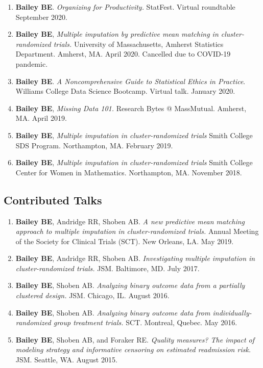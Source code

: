 \documentclass[
  fleqn, oneside]{article}
\begin{document}
\begin{enumerate}
\def\labelenumi{\arabic{enumi}.}
\item
  \textbf{Bailey BE}. \emph{Organizing for Productivity.} StatFest.
  Virtual roundtable September 2020.
\item
  \textbf{Bailey BE}, \emph{Multiple imputation by predictive mean
  matching in cluster-randomized trials.} University of Massachusetts,
  Amherst Statistics Department. Amherst, MA. April 2020. Cancelled due
  to COVID-19 pandemic.
\item
  \textbf{Bailey BE}. \emph{A Noncomprehensive Guide to Statistical
  Ethics in Practice}. Williams College Data Science Bootcamp. Virtual
  talk. January 2020.
\item
  \textbf{Bailey BE}, \emph{Missing Data 101.} Research Bytes @
  MassMutual. Amherst, MA. April 2019.
\item
  \textbf{Bailey BE}, \emph{Multiple imputation in cluster-randomized
  trials} Smith College SDS Program. Northampton, MA. February 2019.
\item
  \textbf{Bailey BE}, \emph{Multiple imputation in cluster-randomized
  trials} Smith College Center for Women in Mathematics. Northampton,
  MA. November 2018.
\end{enumerate}

\hypertarget{contributed-talks}{%
\subsection{Contributed Talks}\label{contributed-talks}}

\begin{enumerate}
\def\labelenumi{\arabic{enumi}.}
\item
  \textbf{Bailey BE}, Andridge RR, Shoben AB. \emph{A new predictive
  mean matching approach to multiple imputation in cluster-randomized
  trials.} Annual Meeting of the Society for Clinical Trials (SCT). New
  Orleans, LA. May 2019.
\item
  \textbf{Bailey BE}, Andridge RR, Shoben AB. \emph{Investigating
  multiple imputation in cluster-randomized trials.} JSM. Baltimore, MD.
  July 2017.
\item
  \textbf{Bailey BE}, Shoben AB. \emph{Analyzing binary outcome data
  from a partially clustered design.} JSM. Chicago, IL. August 2016.
\item
  \textbf{Bailey BE}, Shoben AB. \emph{Analyzing binary outcome data
  from individually-randomized group treatment trials.} SCT. Montreal,
  Quebec. May 2016.
\item
  \textbf{Bailey BE}, Shoben AB, and Foraker RE. \emph{Quality measures?
  The impact of modeling strategy and informative censoring on estimated
  readmission risk.} JSM. Seattle, WA. August 2015.
\end{enumerate}
\end{document}

